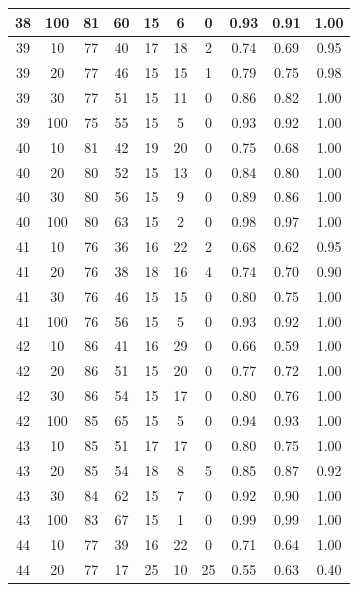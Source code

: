 \begin{longtable}{ |c|c|c|c|c|c|c|c|c|c| }
            38 & 100 & 81 & 60 & 15 & 6 & 0 & 0.93 & 0.91 & 1.00 \\ \hline
            39 & 10 & 77 & 40 & 17 & 18 & 2 & 0.74 & 0.69 & 0.95 \\ \hline
            39 & 20 & 77 & 46 & 15 & 15 & 1 & 0.79 & 0.75 & 0.98 \\ \hline
            39 & 30 & 77 & 51 & 15 & 11 & 0 & 0.86 & 0.82 & 1.00 \\ \hline
            39 & 100 & 75 & 55 & 15 & 5 & 0 & 0.93 & 0.92 & 1.00 \\ \hline
            40 & 10 & 81 & 42 & 19 & 20 & 0 & 0.75 & 0.68 & 1.00 \\ \hline
            40 & 20 & 80 & 52 & 15 & 13 & 0 & 0.84 & 0.80 & 1.00 \\ \hline
            40 & 30 & 80 & 56 & 15 & 9 & 0 & 0.89 & 0.86 & 1.00 \\ \hline
            40 & 100 & 80 & 63 & 15 & 2 & 0 & 0.98 & 0.97 & 1.00 \\ \hline
            41 & 10 & 76 & 36 & 16 & 22 & 2 & 0.68 & 0.62 & 0.95 \\ \hline
            41 & 20 & 76 & 38 & 18 & 16 & 4 & 0.74 & 0.70 & 0.90 \\ \hline
            41 & 30 & 76 & 46 & 15 & 15 & 0 & 0.80 & 0.75 & 1.00 \\ \hline
            41 & 100 & 76 & 56 & 15 & 5 & 0 & 0.93 & 0.92 & 1.00 \\ \hline
            42 & 10 & 86 & 41 & 16 & 29 & 0 & 0.66 & 0.59 & 1.00 \\ \hline
            42 & 20 & 86 & 51 & 15 & 20 & 0 & 0.77 & 0.72 & 1.00 \\ \hline
            42 & 30 & 86 & 54 & 15 & 17 & 0 & 0.80 & 0.76 & 1.00 \\ \hline
            42 & 100 & 85 & 65 & 15 & 5 & 0 & 0.94 & 0.93 & 1.00 \\ \hline
            43 & 10 & 85 & 51 & 17 & 17 & 0 & 0.80 & 0.75 & 1.00 \\ \hline
            43 & 20 & 85 & 54 & 18 & 8 & 5 & 0.85 & 0.87 & 0.92 \\ \hline
            43 & 30 & 84 & 62 & 15 & 7 & 0 & 0.92 & 0.90 & 1.00 \\ \hline
            43 & 100 & 83 & 67 & 15 & 1 & 0 & 0.99 & 0.99 & 1.00 \\ \hline
            44 & 10 & 77 & 39 & 16 & 22 & 0 & 0.71 & 0.64 & 1.00 \\ \hline
            44 & 20 & 77 & 17 & 25 & 10 & 25 & 0.55 & 0.63 & 0.40 \\ \hline

\end{longtable}
